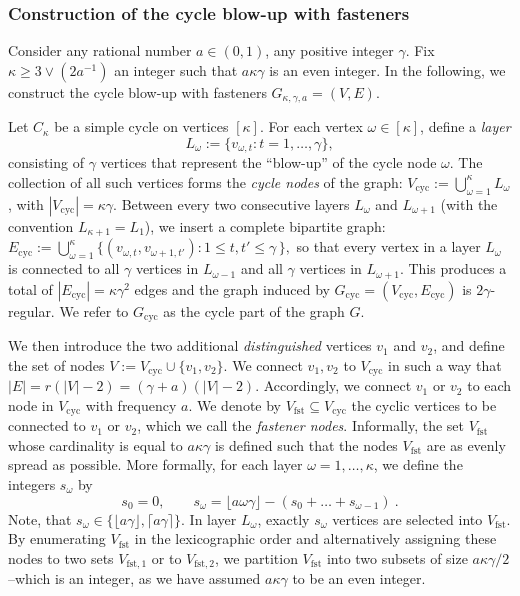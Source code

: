 \documentclass[final]{colt2026}
\newcommand{\1}{\mathbf{1}}
\begin{document}
\subsubsection{Construction of the cycle blow-up  with fasteners}\label{sec:blow-up:def}


Consider any rational number $a\in (0,1)$, any positive integer $\gamma$. Fix $\kappa\geq 3\vee (2a^{-1})$ an integer such that $a\kappa \gamma$ is an even integer. In the following, we construct the cycle blow-up with fasteners $G_{\kappa,\gamma,a}=(V,E)$. 

Let $C_\kappa$ be a simple cycle on vertices $[\kappa]$. For each vertex $\omega\in [\kappa]$, define a \emph{layer}
\[
L_\omega := \{ v_{\omega,t}: t=1,\dots,\gamma\},
\]
consisting of $\gamma$ vertices that represent the ``blow-up'' of the cycle node $\omega$. The collection of all such vertices forms the \emph{cycle nodes} of the graph:
$V_{\mathrm{cyc}} := \bigcup_{\omega=1}^\kappa L_\omega$, with $|V_{\mathrm{cyc}}| = \kappa \gamma$.
Between every two consecutive layers $L_\omega$ and $L_{\omega+1}$ (with the convention $L_{\kappa+1}=L_1$), we insert a complete bipartite graph:
$
E_{\mathrm{cyc}} := \bigcup_{\omega=1}^\kappa \{(v_{\omega,t},v_{\omega+1,t'}) : 1\le t,t'\le \gamma\,\},
$
so that every vertex in a layer $L_\omega$ is connected to all $\gamma$ vertices in $L_{\omega-1}$ and all $\gamma$ vertices in $L_{\omega+1}$. This produces a total of $|E_{\mathrm{cyc}}| = \kappa \gamma^2$ edges and the graph induced by $G_{\mathrm{cyc}}=(V_{\mathrm{cyc}},E_{\mathrm{cyc}})$ is $2\gamma$-regular. We refer to $G_{\mathrm{cyc}}$ as the cycle part of the graph $G$. 

We then introduce the two additional \emph{distinguished} vertices $v_1$ and $v_2$, and define the set of nodes $V := V_{\mathrm{cyc}} \cup \{v_1,v_2\}$. 
We connect $v_{1},v_{2}$ to $V_{\mathrm{cyc}}$ in such a way that $|E|=r(|V|-2)=(\gamma+a)(|V|-2)$. Accordingly, we connect $v_{1}$ or $v_{2}$ to each node in $V_{\mathrm{cyc}}$ with frequency $a$. 
We denote by 
 $V_{\mathrm{fst}}\subseteq V_{\mathrm{cyc}}$ the cyclic vertices to be connected to $v_1$ or $v_2$,  which we call the \emph{fastener nodes}. Informally, the set $V_{\mathrm{fst}}$ whose cardinality is equal to $a \kappa \gamma$ is defined such that the nodes $V_{\mathrm{fst}}$ are as evenly spread as possible. More formally, for each layer \(\omega=1,\dots,\kappa\), we define the integers $s_\omega$ by
\begin{equation}\label{eq:definition:Fastener}
s_0=0,\qquad s_\omega = \lfloor a \omega \gamma \rfloor - (s_{0}+\ldots+s_{\omega-1})\ . 
\end{equation}
Note, that $s_{\omega}\in \{\lfloor a \gamma\rfloor, \lceil a \gamma\rceil\}$. In layer $L_\omega$, exactly $s_\omega$ vertices are selected into $V_{\mathrm{fst}}$. By enumerating $V_{\mathrm{fst}}$ in the lexicographic order and alternatively assigning these nodes to two sets $V_{\mathrm{fst},1}$ or to $V_{\mathrm{fst},2}$,  we partition $V_{\mathrm{fst}}$ into two subsets of size $a\kappa\gamma/2$ --which is  an integer, as we have assumed $a\kappa \gamma$ to be an even integer. 
\end{document}
